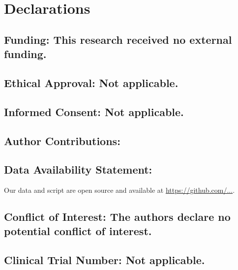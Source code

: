 \section*{Declarations}
\label{Declarations}

\subsection*{Funding: This research received no external funding.}

\subsection*{Ethical Approval: Not applicable.}

\subsection*{Informed Consent: Not applicable.}

\subsection*{Author Contributions:}

\subsection*{Data Availability Statement:}
Our data and script are open source and available at \url{https://github.com/...}.
\subsection*{Conflict of Interest: The authors declare no potential conflict of interest.}

\subsection*{Clinical Trial Number: Not applicable.}
